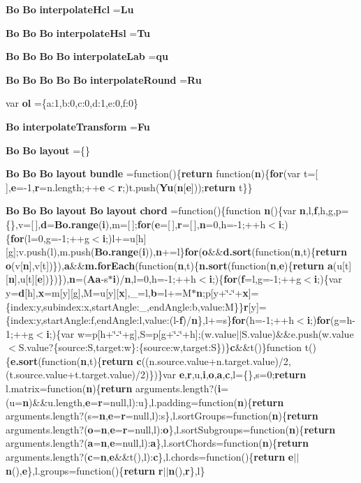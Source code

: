 \begin{DoxyCompactItemize}
\item 
{\bf Bo} {\bf Bo} {\bf interpolate\+Hcl} ={\bf Lu}
\item 
{\bf Bo} {\bf Bo} {\bf Bo} {\bf interpolate\+Hsl} ={\bf Tu}
\item 
{\bf Bo} {\bf Bo} {\bf Bo} {\bf Bo} {\bf interpolate\+Lab} ={\bf qu}
\item 
{\bf Bo} {\bf Bo} {\bf Bo} {\bf Bo} {\bf Bo} {\bf interpolate\+Round} ={\bf Ru}
\item 
var {\bf ol} =\{a\+:1,b\+:0,c\+:0,d\+:1,e\+:0,f\+:0\}
\item 
{\bf Bo} {\bf interpolate\+Transform} ={\bf Fu}
\item 
{\bf Bo} {\bf Bo} {\bf layout} =\{\}
\item 
{\bf Bo} {\bf Bo} {\bf Bo} {\bf layout} {\bf bundle} =function()\{{\bf return} function({\bf n})\{{\bf for}(var t=[$\,$],{\bf e}=-\/1,{\bf r}=n.\+length;++{\bf e}$<${\bf r};)t.\+push({\bf Yu}({\bf n}[{\bf e}]));{\bf return} t\}\}
\item 
{\bf Bo} {\bf Bo} {\bf Bo} {\bf layout} {\bf Bo} {\bf layout} {\bf chord} =function()\{function {\bf n}()\{var {\bf n},l,{\bf f},h,g,p=\{\},v=[$\,$],{\bf d}={\bf Bo.\+range}({\bf i}),m=[$\,$];{\bf for}({\bf e}=[$\,$],{\bf r}=[$\,$],{\bf n}=0,h=-\/1;++h$<${\bf i};)\{{\bf for}(l=0,g=-\/1;++g$<${\bf i};)l+=u[h][g];v.\+push(l),m.\+push({\bf Bo.\+range}({\bf i})),{\bf n}+=l\}{\bf for}({\bf o}\&\&{\bf d.\+sort}(function({\bf n},t)\{{\bf return} {\bf o}(v[{\bf n}],v[t])\}),{\bf a}\&\&{\bf m.\+for\+Each}(function({\bf n},t)\{{\bf n.\+sort}(function({\bf n},{\bf e})\{{\bf return} {\bf a}(u[t][{\bf n}],u[t][{\bf e}])\})\}),{\bf n}=({\bf Aa}-\/s$\ast${\bf i})/{\bf n},l=0,h=-\/1;++h$<${\bf i};)\{{\bf for}({\bf f}=l,g=-\/1;++g$<${\bf i};)\{var y={\bf d}[h],{\bf x}=m[y][g],M=u[y][{\bf x}],\+\_\+=l,{\bf b}=l+=M$\ast${\bf n};p[y+\char`\"{}-\/\char`\"{}+{\bf x}]=\{index\+:y,subindex\+:x,start\+Angle\+:\+\_\+,end\+Angle\+:b,value\+:\+M\}\}{\bf r}[y]=\{index\+:y,start\+Angle\+:f,end\+Angle\+:l,value\+:(l-\/{\bf f})/{\bf n}\},l+=s\}{\bf for}(h=-\/1;++h$<${\bf i};){\bf for}(g=h-\/1;++g$<${\bf i};)\{var w=p[h+\char`\"{}-\/\char`\"{}+g],S=p[g+\char`\"{}-\/\char`\"{}+h];(w.\+value$\vert$$\vert$S.\+value)\&\&e.\+push(w.\+value$<$S.\+value?\{source\+:\+S,target\+:w\}\+:\{source\+:w,target\+:\+S\})\}{\bf c}\&\&t()\}function t()\{{\bf e.\+sort}(function({\bf n},t)\{{\bf return} {\bf c}((n.\+source.\+value+n.\+target.\+value)/2,(t.\+source.\+value+t.\+target.\+value)/2)\})\}var {\bf e},{\bf r},u,{\bf i},{\bf o},{\bf a},{\bf c},l=\{\},s=0;{\bf return} l.\+matrix=function({\bf n})\{{\bf return} arguments.\+length?({\bf i}=(u={\bf n})\&\&u.\+length,{\bf e}={\bf r}=null,l)\+:u\},l.\+padding=function({\bf n})\{{\bf return} arguments.\+length?(s={\bf n},{\bf e}={\bf r}=null,l)\+:s\},l.\+sort\+Groups=function({\bf n})\{{\bf return} arguments.\+length?({\bf o}={\bf n},{\bf e}={\bf r}=null,l)\+:{\bf o}\},l.\+sort\+Subgroups=function({\bf n})\{{\bf return} arguments.\+length?({\bf a}={\bf n},{\bf e}=null,l)\+:{\bf a}\},l.\+sort\+Chords=function({\bf n})\{{\bf return} arguments.\+length?({\bf c}={\bf n},{\bf e}\&\&t(),l)\+:{\bf c}\},l.\+chords=function()\{{\bf return} {\bf e}$\vert$$\vert${\bf n}(),{\bf e}\},l.\+groups=function()\{{\bf return} {\bf r}$\vert$$\vert${\bf n}(),{\bf r}\},l\}
$$
\end{DoxyCompactItemize}

